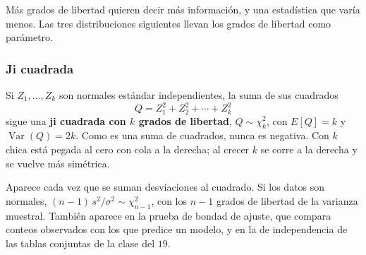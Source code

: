 \documentclass[11pt,letterpaper]{article}
\begin{document}
Más grados de libertad quieren decir más información, y una
estadística que varía menos. Las tres distribuciones siguientes llevan
los grados de libertad como parámetro.


\subsubsection*{Ji cuadrada}

Si $Z_1, \ldots, Z_k$ son normales estándar independientes, la suma de
sus cuadrados
\[
    Q = Z_1^2 + Z_2^2 + \cdots + Z_k^2
\]
sigue una \textbf{ji cuadrada con $k$ grados de libertad}, $Q \sim
\chi^2_k$, con $E[Q] = k$ y $\operatorname{Var}(Q) = 2k$. Como es una
suma de cuadrados, nunca es negativa. Con $k$ chica está pegada al
cero con cola a la derecha; al crecer $k$ se corre a la derecha y se
vuelve más simétrica.

Aparece cada vez que se suman desviaciones al cuadrado. Si los datos
son normales, $(n - 1)\, s^2 / \sigma^2 \sim \chi^2_{n-1}$, con los
$n - 1$ grados de libertad de la varianza muestral. También aparece en
la prueba de bondad de ajuste, que compara conteos observados con los
que predice un modelo, y en la de independencia de las tablas
conjuntas de la clase del $19$.
\end{document}
